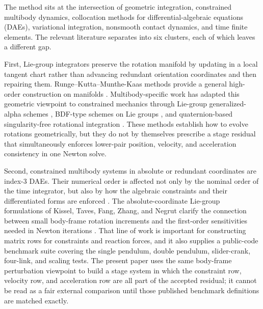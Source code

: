 \documentclass[preprint,12pt]{elsarticle}
\begin{document}
The method sits at the intersection of geometric integration, constrained
multibody dynamics, collocation methods for differential-algebraic equations
(DAEs), variational integration, nonsmooth contact dynamics, and time finite
elements. The relevant literature separates into six clusters, each of which
leaves a different gap.

First, Lie-group integrators preserve the rotation manifold by updating in a
local tangent chart rather than advancing redundant orientation coordinates and
then repairing them. Runge--Kutta--Munthe-Kaas methods provide a general
high-order construction on manifolds \cite{munthe1998lie,munthe1999high}.
Multibody-specific work has adapted this geometric viewpoint to constrained
mechanics through Lie-group generalized-alpha schemes \cite{bruls2012lie},
BDF-type schemes on Lie groups \cite{wieloch2021bdf}, and quaternion-based
singularity-free rotational integration
\cite{terze2016singularity,terze2020aircraft}. These methods establish how to
evolve rotations geometrically, but they do not by themselves prescribe a
stage residual that simultaneously enforces lower-pair position, velocity, and
acceleration consistency in one Newton solve.

Second, constrained multibody systems in absolute or redundant coordinates are
index-3 DAEs. Their numerical order is affected not only by the nominal order
of the time integrator, but also by how the algebraic constraints and their
differentiated forms are enforced \cite{hairer1993solving}. The
absolute-coordinate Lie-group formulations of Kissel, Taves, Fang, Zhang, and
Negrut clarify the connection between small body-frame rotation increments and
the first-order sensitivities needed in Newton iterations
\cite{taves2020exponential,kissel2021dwelling,kissel2022absolute,fang2023halfimplicit,kissel2024velocitypartitioning}.
That line of work is important for constructing matrix rows for constraints
and reaction forces, and it also supplies a public-code benchmark suite
covering the single pendulum, double pendulum, slider-crank, four-link, and
scaling tests. The present paper uses the same body-frame perturbation
viewpoint to build a stage system in which the constraint row, velocity row,
and acceleration row are all part of the accepted residual; it cannot be read
as a fair external comparison until those published benchmark definitions are
matched exactly.
\end{document}
